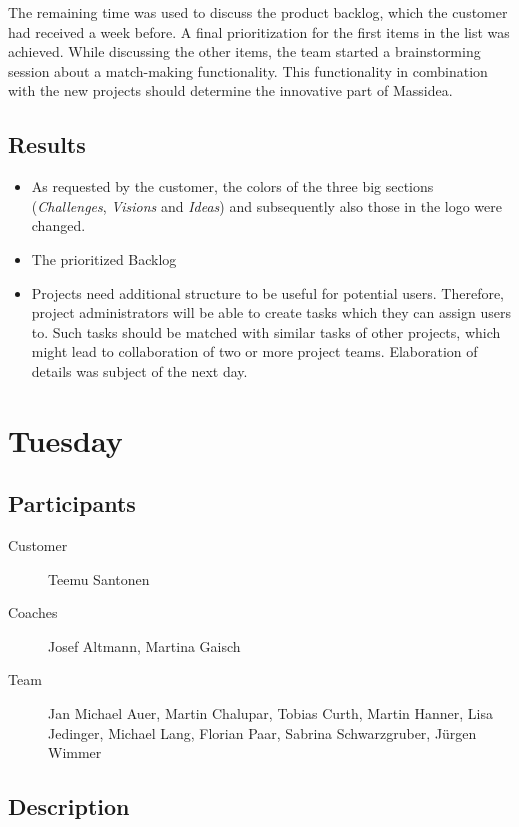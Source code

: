 \documentclass[a4paper,oneside,titlepage]{article}
\begin{document}
The remaining time was used to discuss the product backlog, which the customer had received a week before. A final prioritization for the first items in the list was achieved. While discussing the other items, the team started a brainstorming session about a match-making functionality. This functionality in combination with the new projects should determine the innovative part of Massidea.

\subsection{Results}

\begin{itemize}
	\item As requested by the customer, the colors of the three big sections (\emph{Challenges}, \emph{Visions} and \emph{Ideas}) and subsequently also those in the logo were changed.
	\item The prioritized Backlog
	\item Projects need additional structure to be useful for potential users. Therefore, project administrators will be able to create tasks which they can assign users to. Such tasks should be matched with similar tasks of other projects, which might lead to collaboration of two or more project teams. Elaboration of details was subject of the next day.
\end{itemize}


\pagebreak
\section{Tuesday}

\subsection{Participants}

\begin{description}
	\item[Customer] Teemu Santonen
	\item[Coaches] Josef Altmann, Martina Gaisch
	\item[Team] Jan Michael Auer, Martin Chalupar, Tobias Curth, Martin Hanner, Lisa Jedinger, Michael Lang, Florian Paar, Sabrina Schwarzgruber, Jürgen Wimmer
\end{description}

\subsection{Description}
\end{document}
